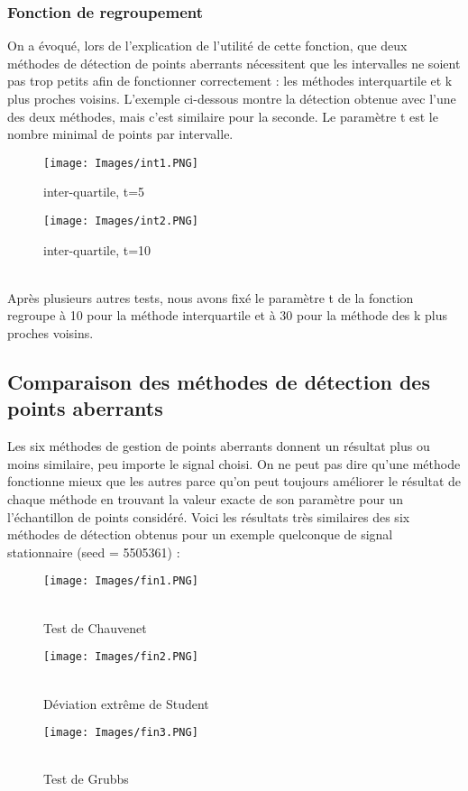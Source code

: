 \documentclass[a4paper,12pt]{article} %
\begin{document}
        \subsubsection{Fonction de regroupement}
        On a évoqué, lors de l'explication de l'utilité de cette fonction, que deux méthodes de détection de points aberrants nécessitent que les intervalles ne soient pas trop petits afin de fonctionner correctement : les méthodes interquartile et k plus proches voisins. L'exemple ci-dessous montre la détection obtenue avec l'une des deux méthodes, mais c'est similaire pour la seconde. Le paramètre t est le nombre minimal de points par intervalle.
         \begin{figure}[H] %
        \texttt{[image: Images/int1.PNG]} %
        \caption{inter-quartile, t=5} %
        \label{m15} %
        \endminipage
        \texttt{[image: Images/int2.PNG]}  
        \caption{inter-quartile, t=10}
        \label{m5}
        \endminipage
        \end{figure}
        \\
        Après plusieurs autres tests, nous avons fixé le paramètre t de la fonction regroupe à 10 pour la méthode interquartile et à 30 pour la méthode des k plus proches voisins.
        
        
        \subsection{Comparaison des méthodes de détection des points aberrants}
        Les six méthodes de gestion de points aberrants donnent un résultat plus ou moins similaire, peu importe le signal choisi. On ne peut pas dire qu'une méthode fonctionne mieux que les autres parce qu'on peut toujours améliorer le résultat de chaque méthode en trouvant la valeur exacte de son paramètre pour un l'échantillon de points considéré. Voici les résultats très similaires des six méthodes de détection obtenus pour un exemple quelconque de signal stationnaire (seed = 5505361) :
        \begin{figure}[H] %
        \texttt{[image: Images/fin1.PNG]} %
        \caption{\\Test de Chauvenet} %
        \label{m15} %
        \endminipage
        \hfill
        \endminipage
        \texttt{[image: Images/fin2.PNG]}  
        \caption{\\Déviation extrême de Student}
        \label{m5}
        \endminipage
        \hfill
        \endminipage
        \texttt{[image: Images/fin3.PNG]}  
        \caption{\\Test de Grubbs}
        \label{m35}
        \endminipage
        \end{figure}
        
\end{document}
